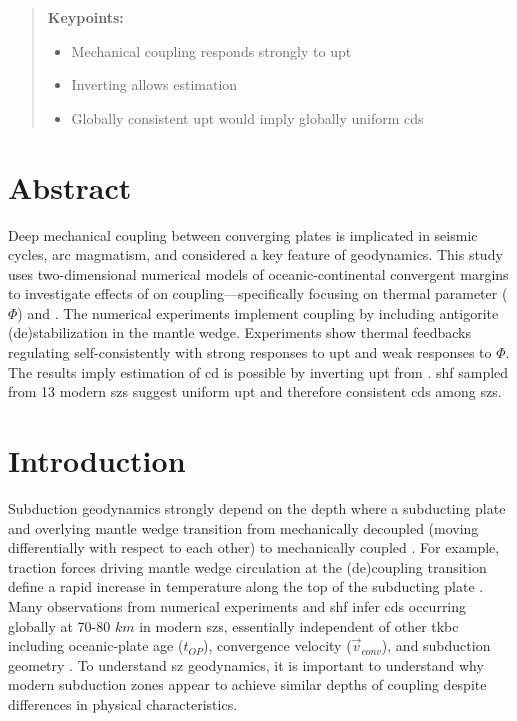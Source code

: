 
\begin{quote}
\textbf{Keypoints:}

\begin{itemize}
\item
  Mechanical coupling responds strongly to \gls{upt}
\item
  Inverting  allows  estimation
\item
  Globally consistent \gls{upt} would imply globally uniform \glspl{cd}
\end{itemize}
\end{quote}

\hypertarget{abstract}{%
\section{Abstract}\label{abstract}}

Deep mechanical coupling between converging plates is implicated in seismic cycles, arc magmatism, and considered a key feature of  geodynamics. This study uses two-dimensional numerical models of oceanic-continental convergent margins to investigate effects of  on coupling---specifically focusing on thermal parameter (\(\Phi\)) and . The numerical experiments implement coupling by including antigorite (de)stabilization in the mantle wedge. Experiments show thermal feedbacks regulating  self-consistently with strong responses to \gls{upt} and weak responses to \(\Phi\). The results imply estimation of \gls{cd} is possible by inverting \gls{upt} from . \gls{shf} sampled from 13 modern \glspl{sz} suggest uniform \gls{upt} and therefore consistent \glspl{cd} among \glspl{sz}.

\hypertarget{introduction-1}{%
\section{Introduction}\label{introduction-1}}

Subduction geodynamics strongly depend on the depth where a subducting plate and overlying mantle wedge transition from mechanically decoupled (moving differentially with respect to each other) to mechanically coupled \citep[moving with the same local velocity,][]{Furukawa1993, Peacock1994, Wada2008}. For example, traction forces driving mantle wedge circulation at the (de)coupling transition define a rapid increase in temperature along the top of the subducting plate \citep{Peacock1996}. Many observations from numerical experiments and \gls{shf} infer \glspl{cd} occurring globally at 70-80 \(km\) in modern \glspl{sz}, essentially independent of other \gls{tkbc} including oceanic-plate age (\(t_{OP}\)), convergence velocity (\(\vec{v}_{conv}\)), and subduction geometry \citep{Furukawa1993, Wada2008, Wada2009}. To understand \gls{sz} geodynamics, it is important to understand why modern subduction zones appear to achieve similar depths of coupling despite differences in physical characteristics.

